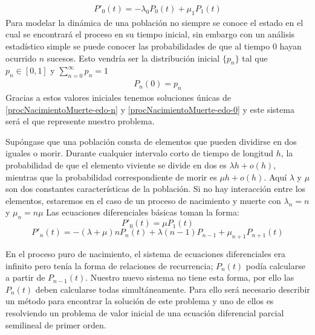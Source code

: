 \begin{eqnarray}
    P'_0(t)=-\lambda_0 P_0(t)+\mu_{1}P_{1}(t)
\label{procNacimientoMuerte-edo-0}
\end{eqnarray}
Para modelar la dinámica de una población no siempre se conoce el estado en el cual se encontrará el proceso en su tiempo inicial, sin embargo con un análisis estadístico simple se puede conocer las probabilidades de que al tiempo $0$ hayan ocurrido $n$ sucesos. Esto vendría ser la distribución inicial $\{p_n\}$ tal que $p_n\in [0,1]$ y $\sum_{n=0}^\infty p_n =1$
\begin{eqnarray}
    P_n(0)=p_n
\end{eqnarray}
Gracias a estos valores iniciales tenemos soluciones únicas de \ref{procNacimientoMuerte-edo-n} y \ref{procNacimientoMuerte-edo-0} y este sistema será el que represente nuestro problema.\\
\begin{Ejm}
Supóngase que una población consta de elementos que pueden dividirse en dos iguales o morir. Durante cualquier intervalo corto de tiempo de longitud $h$, la probabilidad de que el elemento viviente se divide en dos es $\lambda h+ o(h)$, mientras que la probabilidad correspondiente de morir es $\mu h + o(h)$. Aquí $\lambda$ y $\mu$ son dos constantes características de la población. Si no hay interacción entre los elementos, estaremos en el caso de un proceso de nacimiento y muerte con $\lambda_n=n$ y $\mu_n =n \mu$
Las ecuaciones diferenciales básicas toman la forma:
$$P'_0(t)=\mu P_1(t)$$
$$P'_n(t)=-(\lambda+\mu)n P_n(t)+\lambda(n-1)P_{n-1}+\mu_{n+1}P_{n+1}(t)$$
\end{Ejm}
En el proceso puro de nacimiento, el sistema de ecuaciones diferenciales era infinito pero tenía la forma de relaciones de recurrencia; $P_n(t)$ podía calcularse a partir de $P_{n-1}(t)$. Nuestro nuevo sistema no tiene esta forma, por ello las $P_n(t)$ deben calcularse todas simultáneamente. Para ello será necesario describir un método para encontrar la solución de este problema y uno de ellos es resolviendo un problema de valor inicial de una ecuación diferencial parcial semilineal de primer orden.